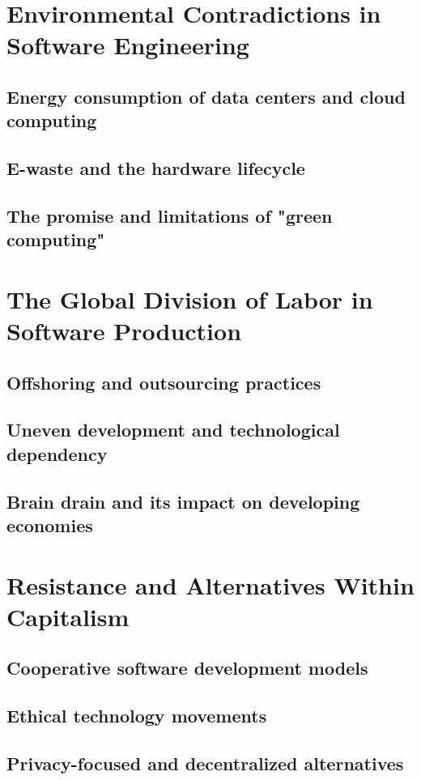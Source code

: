 \newpage
\section{Environmental Contradictions in Software Engineering}
\subsection{Energy consumption of data centers and cloud computing}
\subsection{E-waste and the hardware lifecycle}
\subsection{The promise and limitations of "green computing"}

\newpage
\section{The Global Division of Labor in Software Production}
\subsection{Offshoring and outsourcing practices}
\subsection{Uneven development and technological dependency}
\subsection{Brain drain and its impact on developing economies}

\newpage
\section{Resistance and Alternatives Within Capitalism}
\subsection{Cooperative software development models}
\subsection{Ethical technology movements}
\subsection{Privacy-focused and decentralized alternatives}
